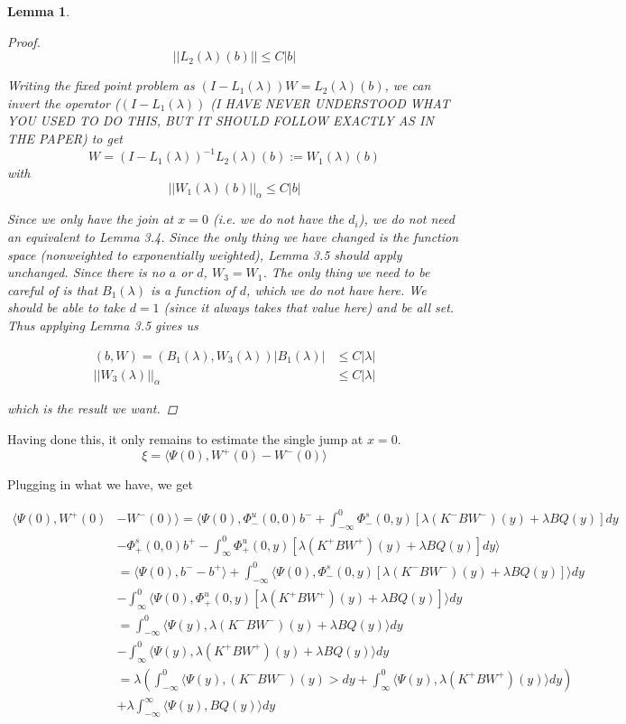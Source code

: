 \documentclass[12pt]{article}
\newtheorem{lemma}{Lemma}
\begin{document}
\begin{lemma}
\begin{proof}
\[
||L_2(\lambda)(b)|| \leq C|b|
\]

Writing the fixed point problem as $(I - L_1(\lambda))W = L_2(\lambda)(b)$, we can invert the operator ($(I - L_1(\lambda))$ (I HAVE NEVER UNDERSTOOD WHAT YOU USED TO DO THIS, BUT IT SHOULD FOLLOW EXACTLY AS IN THE PAPER) to get
\[
W = (I - L_1(\lambda))^{-1} L_2(\lambda)(b) := W_1(\lambda)(b)
\]
with 
\[
||W_1(\lambda)(b)||_\alpha \leq C|b|
\]

Since we only have the join at $x = 0$ (i.e. we do not have the $d_i$), we do not need an equivalent to Lemma 3.4. Since the only thing we have changed is the function space (nonweighted to exponentially weighted), Lemma 3.5 should apply unchanged. Since there is no $a$ or $d$, $W_3 = W_1$. The only thing we need to be careful of is that $B_1(\lambda)$ is a function of $d$, which we do not have here. We should be able to take $d = 1$ (since it always takes that value here) and be all set. Thus applying Lemma 3.5 gives us

\begin{align*}
(b, W) = (B_1(\lambda), W_3(\lambda))
|B_1(\lambda)| &\leq C|\lambda| \\
||W_3(\lambda)||_\alpha &\leq C|\lambda|
\end{align*}

which is the result we want.
\end{proof}
\end{lemma}

Having done this, it only remains to estimate the single jump at $x = 0$.
\[
\xi = \langle \Psi(0), W^+(0) - W^-(0) \rangle
\]

Plugging in what we have, we get

\begin{align*}
\langle\Psi(0), W^+(0) &- W^-(0)\rangle = \langle \Psi(0), \Phi^u_-(0, 0)b^- + \int_{-\infty}^0 \Phi^s_-(0, y)[\lambda (K^- B W^-)(y) + \lambda B Q(y) ] dy  \\
&- \Phi^s_+(0, 0)b^+ - \int_\infty^0 \Phi^u_+(0, y)[\lambda (K^+ B W^+)(y) + \lambda B Q(y) ] dy \rangle\\
&= \langle \Psi(0), b^- - b^+\rangle + \int_{-\infty}^0 \langle \Psi(0), \Phi^s_-(0, y)[\lambda (K^- B W^-)(y) + \lambda B Q(y) ] \rangle dy  \\
&- \int_\infty^0 \langle \Psi(0), \Phi^u_+(0, y)[\lambda (K^+ B W^+)(y) + \lambda B Q(y) ] \rangle dy  \\
&= \int_{-\infty}^0 \langle \Psi(y), \lambda (K^- B W^-)(y) + \lambda B Q(y) \rangle dy \\
&- \int_\infty^0 \langle \Psi(y), \lambda (K^+ B W^+)(y) + \lambda B Q(y)  \rangle dy \\
&= \lambda\left( \int_{-\infty}^0 \langle \Psi(y), (K^- B W^-)(y) > dy + \int_\infty^0 \langle \Psi(y), \lambda (K^+ B W^+)(y) \rangle dy \right) \\
&+ \lambda \int_{-\infty}^\infty \langle\Psi(y), BQ(y) \rangle dy
\end{align*}
\end{document}
